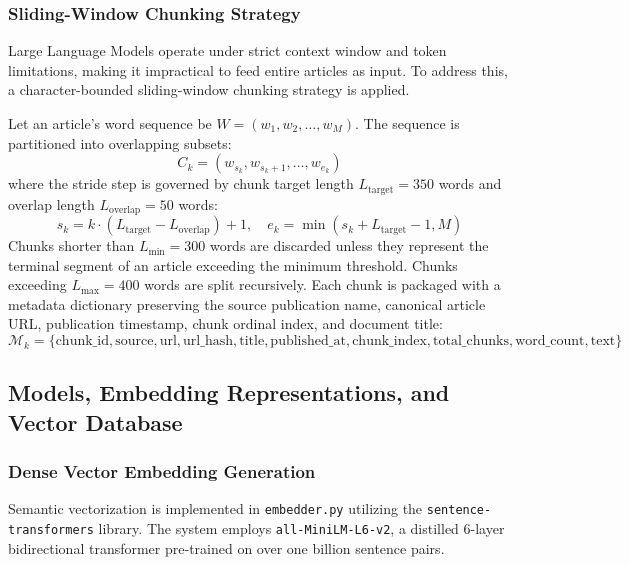 \subsubsection{Sliding-Window Chunking Strategy}
Large Language Models operate under strict context window and token limitations, making it impractical to feed entire articles as input. To address this, a character-bounded sliding-window chunking strategy is applied.

Let an article's word sequence be $W = (w_1, w_2, \dots, w_M)$. The sequence is partitioned into overlapping subsets:
\begin{equation}
\label{eq:chunk_window}
C_k = (w_{s_k}, w_{s_k + 1}, \dots, w_{e_k})
\end{equation}
where the stride step is governed by chunk target length $L_{\text{target}} = 350$ words and overlap length $L_{\text{overlap}} = 50$ words:
\begin{equation}
s_k = k \cdot (L_{\text{target}} - L_{\text{overlap}}) + 1, \quad e_k = \min(s_k + L_{\text{target}} - 1, M)
\end{equation}
Chunks shorter than $L_{\text{min}} = 300$ words are discarded unless they represent the terminal segment of an article exceeding the minimum threshold. Chunks exceeding $L_{\text{max}} = 400$ words are split recursively. Each chunk is packaged with a metadata dictionary preserving the source publication name, canonical article URL, publication timestamp, chunk ordinal index, and document title:
\begin{equation}
\mathcal{M}_k = \{ \text{chunk\_id}, \text{source}, \text{url}, \text{url\_hash}, \text{title}, \text{published\_at}, \text{chunk\_index}, \text{total\_chunks}, \text{word\_count}, \text{text} \}
\end{equation}

\subsection{Models, Embedding Representations, and Vector Database}
\label{subsec:models_faiss}

\subsubsection{Dense Vector Embedding Generation}
Semantic vectorization is implemented in \texttt{embedder.py} utilizing the \texttt{sentence-transformers} library. The system employs \texttt{all-MiniLM-L6-v2}, a distilled 6-layer bidirectional transformer pre-trained on over one billion sentence pairs. 

